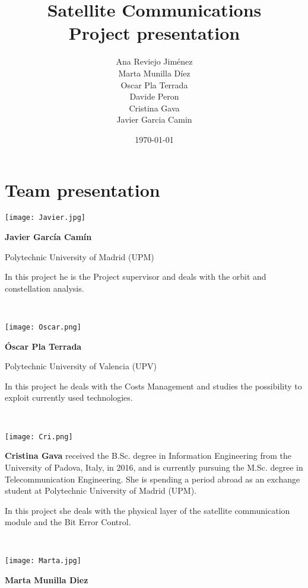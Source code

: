 \documentclass[11pt,a4paper,titlepage]{article}
\title{\blue Satellite Communications \\
\blueb Project presentation}
\author{Ana Reviejo Jiménez \\ Marta Munilla Díez\\ Oscar Pla Terrada\\ Davide Peron\\ Cristina Gava\\ Javier Garcia Camin}
\date{\today}
\begin{document}
\maketitle

\section{Team presentation}{%
\begin{center}
\begin{minipage}{0.2\textwidth}
	\texttt{[image: Javier.jpg]}
\end{minipage}\hspace{0.5cm}
\begin{minipage}{0.7\textwidth}
	\textbf{Javier García Camín}

	Polytechnic University of Madrid (UPM)

In this project he is the Project supervisor and deals with the orbit and constellation analysis.
\end{minipage}\\ \vspace{0.5cm}
\begin{minipage}{0.2\textwidth}
		\texttt{[image: Oscar.png]}
\end{minipage}\hspace{0.5cm}
\begin{minipage}{0.7\textwidth}
	\textbf{Óscar Pla Terrada}

	Polytechnic University of Valencia (UPV)

In this project he deals with the Costs Management and studies the possibility to exploit currently used technologies.
\end{minipage}\\ \vspace{0.5cm}
\begin{minipage}{0.2\textwidth}
	\texttt{[image: Cri.png]}
\end{minipage}\hspace{0.5cm}
\begin{minipage}{0.7\textwidth}
	\textbf{Cristina Gava} received the B.Sc. degree in Information Engineering from the University of Padova, Italy, in 2016, and is currently pursuing the M.Sc. degree in Telecommunication Engineering. She is spending a period abroad as an exchange student at Polytechnic University of Madrid (UPM).

	In this project she deals with the physical layer of the satellite communication module and the Bit Error Control.
\end{minipage}\\ \vspace{0.5cm}
\begin{minipage}{0.2\textwidth}
		\texttt{[image: Marta.jpg]}
\end{minipage}\hspace{0.5cm}
\begin{minipage}{0.7\textwidth}
	\textbf{Marta Munilla Diez}


\end{minipage}
\end{center}}
\end{document}
